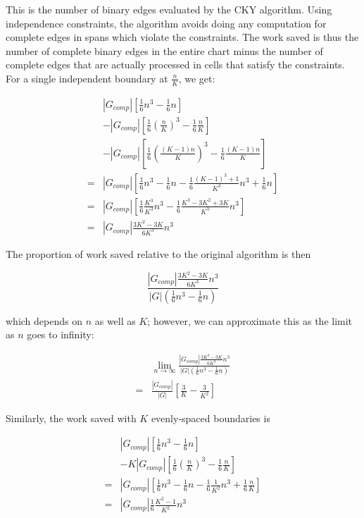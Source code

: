 \documentclass[11pt]{article}
\begin{document}
This is the number of binary edges evaluated by the CKY algorithm. Using
independence constraints, the algorithm avoids doing any computation for
complete edges in spans which violate the constraints. The work saved is thus
the number of complete binary edges in the entire chart minus the number of
complete edges that are actually processed in cells that satisfy the
constraints. For a single independent boundary at $\frac{n}{K}$, we get:

{\small
\begin{equation*}
\begin{split}
& |G_{comp}|[\frac{1}{6}n^3 - \frac{1}{6}n]\\& - |G_{comp}|[\frac{1}{6}(\frac{n}{K})^3 - \frac{1}{6}\frac{n}{K}]\\& - |G_{comp}|[\frac{1}{6}(\frac{(K-1)n}{K})^3 - \frac{1}{6}\frac{(K-1)n}{K}]\\
=& |G_{comp}|[\frac{1}{6}n^3 - \frac{1}{6}n - \frac{1}{6}\frac{(K-1)^3 +1}{K^3}n^3 + \frac{1}{6}n]\\
=& |G_{comp}|[\frac{1}{6}\frac{K^3}{K^3}n^3 - \frac{1}{6}\frac{K^3 - 3K^2 + 3K}{K^3}n^3]\\
=& |G_{comp}|\frac{3K^2 - 3K}{6K^3}n^3
\end{split}
\end{equation*}
}

The proportion of work saved relative to the original algorithm is then

{\small
\begin{equation*}
\frac{|G_{comp}|\frac{3K^2 - 3K}{6K^3}n^3}{|G|(\frac{1}{6}n^3 - \frac{1}{6}n)}
\end{equation*}
}

which depends on $n$ as well as $K$; however, we can approximate this as the limit
as $n$ goes to infinity:

{\small
\begin{equation*}
\begin{split}
& \lim_{n \to \infty}\frac{|G_{comp}|\frac{3K^2 - 3K}{6K^3}n^3}{|G|(\frac{1}{6}n^3 - \frac{1}{6}n)}\\
=& \frac{|G_{comp}|}{|G|}[\frac{3}{K} - \frac{3}{K^2}]
\end{split}
\end{equation*}
}

Similarly, the work saved with $K$ evenly-spaced boundaries is

{\small
\begin{equation*}
\begin{split}
& |G_{comp}|[\frac{1}{6}n^3 - \frac{1}{6}n]\\
& - K|G_{comp}|[\frac{1}{6}(\frac{n}{K})^3 - \frac{1}{6}\frac{n}{K}]\\
=& |G_{comp}|[\frac{1}{6}n^3 - \frac{1}{6}n - \frac{1}{6}\frac{1}{K^2}n^3 + \frac{1}{6}\frac{n}{K}]\\
=& |G_{comp}|\frac{1}{6}\frac{K^2-1}{K^2}n^3
\end{split}
\end{equation*}
}
\end{document}

